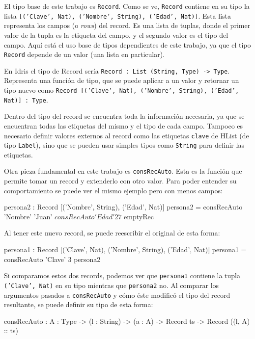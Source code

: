 El tipo base de este trabajo es \texttt{Record}. Como se ve, \texttt{Record} contiene en su tipo la lista \texttt{[('Clave', Nat), ('Nombre', String), ('Edad', Nat)]}. Esta lista representa los campos (o \textit{rows}) del record. Es una lista de tuplas, donde el primer valor de la tupla es la etiqueta del campo, y el segundo valor es el tipo del campo. Aquí está el uso base de tipos dependientes de este trabajo, ya que el tipo \texttt{Record} depende de un valor (una lista en particular).

En Idris el tipo de Record sería \texttt{Record : List (String, Type) -> Type}. Representa una función de tipo, que se puede aplicar a un valor y retornar un tipo nuevo como \texttt{Record [('Clave', Nat), ('Nombre', String), ('Edad', Nat)] : Type}.

Dentro del tipo del record se encuentra toda la información necesaria, ya que se encuentran todas las etiquetas del mismo y el tipo de cada campo. Tampoco es necesario definir valores externos al record como las etiquetas \texttt{clave} de HList (de tipo \texttt{Label}), sino que se pueden usar simples tipos como \texttt{String} para definir las etiquetas.

Otra pieza fundamental en este trabajo es \texttt{consRecAuto}. Esta es la función que permite tomar un record y extenderlo con otro valor. Para poder entender su comportamiento se puede ver el mismo ejemplo pero con menos campos:

\begin{code}
persona2 : Record [('Nombre', String), ('Edad', Nat)]
persona2 = consRecAuto 'Nombre' 'Juan' $
  consRecAuto 'Edad' 27 $
  emptyRec
\end{code}

Al tener este nuevo record, se puede reescribir el original de esta forma:

\begin{code}
persona1 : Record [('Clave', Nat), ('Nombre', String), 
  ('Edad', Nat)]
persona1 = consRecAuto 'Clave' 3 persona2
\end{code}

Si comparamos estos dos records, podemos ver que \texttt{persona1} contiene la tupla \texttt{('Clave', Nat)} en su tipo mientras que \texttt{persona2} no. Al comparar los argumentos pasados a \texttt{consRecAuto} y cómo éste modificó el tipo del record resultante, se puede definir su tipo de esta forma:

\begin{code}
consRecAuto : {A : Type} -> (l : String) -> (a : A) -> 
  Record ts -> Record ((l, A) :: ts)
\end{code}

